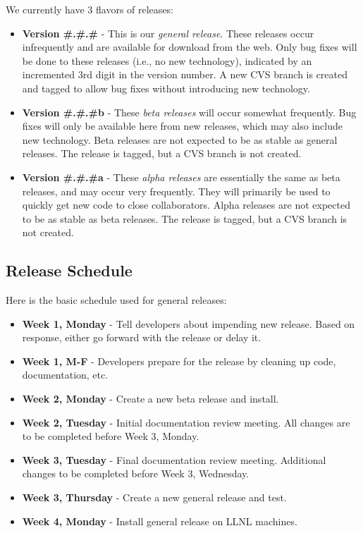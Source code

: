 \noindent
We currently have 3 flavors of releases:
\begin{itemize}
\item {\bf Version \#.\#.\#} - This is our {\em general release}.  These
releases occur infrequently and are available for download from the
web.  Only bug fixes will be done to these releases (i.e., no new
technology), indicated by an incremented 3rd digit in the version
number.  A new CVS branch is created and tagged to allow bug fixes
without introducing new technology.

\item {\bf Version \#.\#.\#b} - These {\em beta releases} will occur somewhat
frequently.  Bug fixes will only be available here from new releases,
which may also include new technology.  Beta releases are not expected
to be as stable as general releases.  The release is tagged, but a CVS
branch is not created.

\item {\bf Version \#.\#.\#a} - These {\em alpha releases} are essentially
the same as beta releases, and may occur very frequently.  They will
primarily be used to quickly get new code to close collaborators.
Alpha releases are not expected to be as stable as beta releases.
The release is tagged, but a CVS branch is not created.
\end{itemize}

\subsection{Release Schedule}
\label{Release Schedule}

Here is the basic schedule used for general releases:
\begin{itemize}
\item {\bf Week 1, Monday} - Tell developers about impending new release.
Based on response, either go forward with the release or delay it.
\item {\bf Week 1, M-F} - Developers prepare for the release by cleaning
up code, documentation, etc.
\item {\bf Week 2, Monday} - Create a new beta release and install.
\item {\bf Week 2, Tuesday} - Initial documentation review meeting.
All changes are to be completed before Week 3, Monday.
\item {\bf Week 3, Tuesday} - Final documentation review meeting.
Additional changes to be completed before Week 3, Wednesday.
\item {\bf Week 3, Thursday} - Create a new general release and test.
\item {\bf Week 4, Monday} - Install general release on LLNL machines.
\end{itemize}

